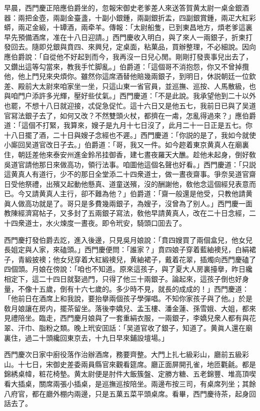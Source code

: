 早晨，西門慶正陪應伯爵坐的，忽報宋御史老爹差人來送答賀黄太尉一桌金銀酒器：兩把金壺，兩副金臺盞，十副小銀鍾，兩副銀折盂，四副銀賞鍾，兩疋大紅彩蟒，兩疋金緞，十罈酒，兩牵羊。傳報：「太尉船隻，已到東昌地方，煩老爹這裏早先預備酒席，准在十八日迎請。」西門慶收入明白，與了來人一兩銀子，折柬打發回去。隨即兑銀與賁四、來興兒，定桌面，粘菓品，買辦整理，不必細說。因向應伯爵說：「自從他不好起到而今，我再沒一日兒心閒。剛剛打發喪事兒出去了，又鑽出這等勾當來，教我手忙脚亂。」伯爵道：「這個哥不消抱怨，你又不曾掉攬他，他上門兒來央煩你。雖然你這席酒替他賠幾兩銀子，到明日，休説朝廷一位欽差、殿前大太尉來咱家坐一坐，只這山東一省官員，並巡撫、巡按、人馬散級，也與咱門户添許多光輝，壓好些仗氣。」西門慶道：「不是此說。我承望他到二十以外也罷，不想十八日就迎接，忒促急促忙。這十六日又是他五七，我前日已與了吴道官冩法銀子去了，如何又改？不然雙頭火杖，都擠在一䖏，怎亂得過來？」應伯爵道：「這個不打緊，我算來，嫂子是九月十七日沒了，此月二十一日正是五七。你十八日擺了酒，二十日與嫂子念經也不遲。」西門慶道：「你説的是了，我如今就使小廝回吴道官改日子去。」伯爵道：「哥，我又一件。如今趂着東京黄真人在廟裏住，朝廷差他來泰安州進金鈴吊挂御香，建七晝夜羅天大醮。趁他未起身，倒好敎吳道官請他那日來做高功，領行法事。咱圖他這個名聲也好看。」西門慶道：「只説這黄真人有道行，少不的那日全堂添二十四衆道士，做一晝夜齋事。爭奈吴道官齋日受他祭禮，出殯又起動他懸真、道童送殯，沒的酬謝他，敎他念這個經兒表意而已。今又請黄真人主行，卻不難為他？」伯爵道：「齋一般還是他受，只教他請黄眞人做高功就是了。哥只是多費幾兩銀子，為嫂子，沒曾為了别人。」西門慶一面教陳經濟寫帖子，又多封了五兩銀子寫法，敎他早請黄真人，改在二十日念經，二十四衆道士，水火煉度一晝夜。即令玳安，騎頭口囬去了。

西門慶打發伯爵去訖，進入後邊，只見吳月娘說：「賁四嫂買了兩個盒兒，他女兒長姐定與人家，來磕頭。」西門慶便問：「誰家？」賁四娘子穿着藍紬襖兒，白絹裙子，青緞披襖；他女兒穿着大紅緞襖兒，黄紬裙子，戴着花翠，插燭向西門慶磕了四個頭。月娘在傍說：「咱也不知道。原來這孩子，與了夏大人房裏擡擧，昨日纔相定下，這二十四日就娶過門，只得了他三十兩銀子。論起來，這孩子倒也好身量，不像十五歲，倒有十六七歲的。多少時不見，就長的成成的！」西門慶道：「他前日在酒席上和我說，要抬擧兩個孩子學彈唱。不知你家孩子與了他。」於是敎月娘讓在房内，擺茶留坐。落後李嬌兒、孟玉樓、潘金蓮、孫雪娥、大姐，都來見禮陪坐。臨走，西門慶月娘與了一套重絹衣服，一兩銀子，李嬌兒衆人都有與花翠、汗巾、脂粉之類。晚上玳安囬話：「吴道官收了銀子，知道了。黄眞人還在廟裏住，過二十頭纔回東京去，十九日早來鋪設壇場。」

西門慶次日家中廚役落作治辦酒席，務要齊整。大門上扎七級彩山，廳前五級彩山。十七日，宋御史差委兩員縣官來觀看筵席。廳正面屏開孔雀，地匝氍毹。都是錦綉桌幃，粧花椅墊。黄太尉便是肘件大飯簇盤、定勝方糖、五老錦豐、堆高頂喫看大插桌，關席兩張小插桌，是巡撫巡按陪坐。兩邊布按三司，有桌席列坐；其餘八府官，都在廳外棚内兩邊，只是五菓五菜平頭桌席。看畢，西門慶待茶，起身回話去了。

